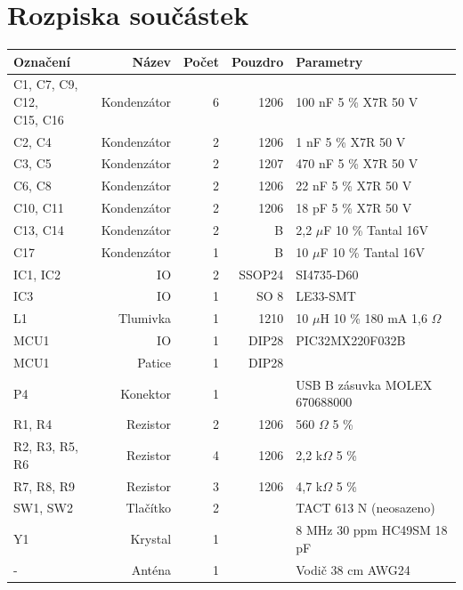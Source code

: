 \documentclass[czech,master,public,dept460,male,cpdeclaration]{diploma}	%
\begin{document}
\section{Rozpiska součástek}
\label{sec:ap-bom}
\begin{center}
\begin{tabular}{|l|r|r|r|l|}

\hline
Označení	& Název &	Počet	&	Pouzdro	&	Parametry\\
\hline
\makecell[l]{C1, C7, C9, C12,\\C15, C16}	&	Kondenzátor	&	6	&	1206	&	100 nF 5 \% X7R  50 V\\
\hline
C2, C4	&	Kondenzátor	&	2	&	1206	& 1 nF 5 \% X7R  50 V\\
\hline
C3, C5	&	Kondenzátor	&	2	&	1207	&	470 nF 5 \% X7R  50 V\\
\hline
C6, C8	&	Kondenzátor	&	2	&	1206	&	22 nF 5 \% X7R  50 V\\
\hline
C10, C11	&	Kondenzátor	&	2	&	1206	&	18 pF 5 \% X7R  50 V\\
\hline
C13, C14	&	Kondenzátor	&	2	&	B	&	2,2 $\mu$F 10 \% Tantal 16V \\
\hline
C17	&	Kondenzátor	&	1	&	B	&	10 $\mu$F 10 \% Tantal 16V \\
\hline
IC1, IC2	&	IO	&	2	&	SSOP24	&	SI4735-D60\\
\hline
IC3	&	IO	&	1	&	SO 8	&	LE33-SMT\\
\hline
L1	&	Tlumivka	&	1	&	1210	&	10 $\mu$H 10 \% 180 mA 1,6 $\Omega$\\
\hline
MCU1	&	IO	&	1	&	DIP28	&	PIC32MX220F032B\\
\hline
MCU1	&	Patice	&	1	&	DIP28	&	\\
\hline
P4	&	Konektor	&	1	&		&	USB B zásuvka  MOLEX 670688000 \\
\hline
R1, R4	&	Rezistor	&	2	&	1206	&	560 $\Omega$ 5 \%\\
\hline
R2, R3, R5, R6	&	Rezistor	&	4	&	1206	&	2,2 k$\Omega$ 5 \%\\
\hline
R7, R8, R9	&	Rezistor	&	3	&	1206	&	4,7 k$\Omega$ 5 \%\\
\hline
SW1, SW2	&	Tlačítko	&	2	&		&	TACT 613 N (neosazeno)\\
\hline
Y1	&	Krystal	&	1	&		&	8 MHz 30 ppm HC49SM 18 pF\\
\hline
-	&	Anténa &	1	&	& Vodič	38 cm AWG24\\
\hline

\end{tabular} 
\end{center}
\end{document}
